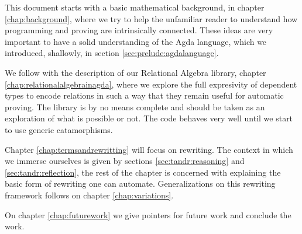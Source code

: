 This document starts with a basic mathematical background, in chapter \ref{chap:background}, where we try to help the unfamiliar reader to understand
how programming and proving are intrinsically connected. These ideas
are very important to have a solid understanding of the Agda language,
which we introduced, shallowly, in section \ref{sec:prelude:agdalanguage}.

We follow with the description of our Relational Algebra library, chapter \ref{chap:relationalalgebrainagda}, where we explore the full expresivity of 
dependent types to encode relations in such a way that they remain
useful for automatic proving. The library is by no means complete and
should be taken as an exploration of what is possible or not. The code
behaves very well until we start to use generic catamorphisms.

Chapter \ref{chap:termsandrewritting} will focus on rewriting. The context
in which we immerse ourselves is given by sections \ref{sec:tandr:reasoning} and
\ref{sec:tandr:reflection}, the rest of the chapter is concerned with
explaining the basic form of rewriting one can automate. Generalizations
on this rewriting framework follows on chapter \ref{chap:variations}.

On chapter \ref{chap:futurework} we give pointers for future work and
conclude the work.

